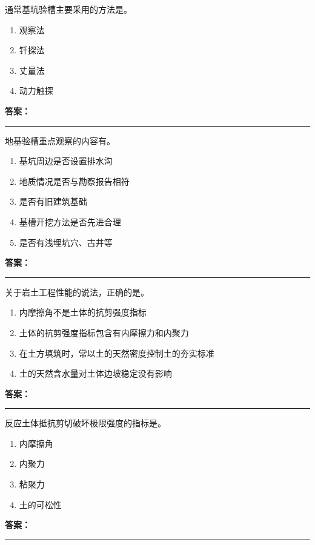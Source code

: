 \documentclass[UTF8,fontset=fandol,11pt]{ctexart}
\newcommand{\answerline}{\textcolor{answerred}{\rule{2.4cm}{0.7pt}}}
\begin{document}
\vspace{0.2em}

\begin{quizbox}[title={第 26 题}]
通常基坑验槽主要采用的方法是。\\
\begin{enumerate}[label=\Alph*.]
\item 观察法
\item 钎探法
\item 丈量法
\item 动力触探
\end{enumerate}
\textbf{\textcolor{answerred}{答案：}} \answerline
\end{quizbox}

\vspace{0.2em}

\begin{quizbox}[title={第 27 题}]
地基验槽重点观察的内容有。\\
\begin{enumerate}[label=\Alph*.]
\item 基坑周边是否设置排水沟
\item 地质情况是否与勘察报告相符
\item 是否有旧建筑基础
\item 基槽开挖方法是否先进合理
\item 是否有浅埋坑穴、古井等
\end{enumerate}
\textbf{\textcolor{answerred}{答案：}} \answerline
\end{quizbox}

\vspace{0.2em}

\begin{quizbox}[title={第 28 题}]
关于岩土工程性能的说法，正确的是。\\
\begin{enumerate}[label=\Alph*.]
\item 内摩擦角不是土体的抗剪强度指标
\item 土体的抗剪强度指标包含有内摩擦力和内聚力
\item 在土方填筑时，常以土的天然密度控制土的夯实标准
\item 土的天然含水量对土体边坡稳定没有影响
\end{enumerate}
\textbf{\textcolor{answerred}{答案：}} \answerline
\end{quizbox}

\vspace{0.2em}

\begin{quizbox}[title={第 29 题}]
反应土体抵抗剪切破坏极限强度的指标是。\\
\begin{enumerate}[label=\Alph*.]
\item 内摩擦角
\item 内聚力
\item 粘聚力
\item 土的可松性
\end{enumerate}
\textbf{\textcolor{answerred}{答案：}} \answerline
\end{quizbox}
\end{document}
